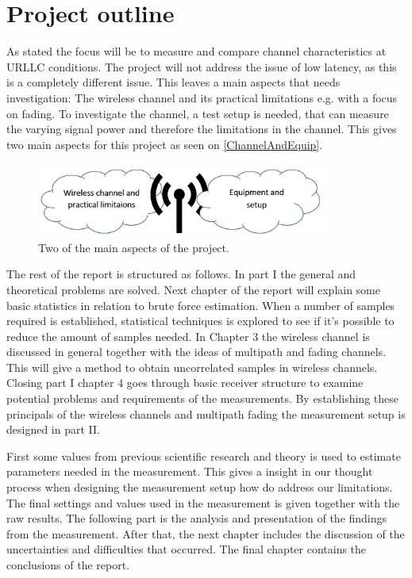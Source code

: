 \section{Project outline}

As stated the focus will be to measure and compare channel characteristics at URLLC conditions. The project will not address the issue of low latency, as this is a completely different issue. This leaves a main aspects that needs investigation: The wireless channel and its practical limitations e.g. with a focus on fading. To investigate the channel, a test setup is needed, that can measure the varying signal power and therefore the limitations in the channel. This gives two main aspects for this project as seen on \autoref{ChannelAndEquip}.

\begin{figure}[H]
\centering
\includegraphics[width=0.85\textwidth]{figures/ProOutline.png}
\caption{Two of the main aspects of the project.}
\label{ChannelAndEquip}
\end{figure}


The rest of the report is structured as follows. In part I the general and theoretical problems are solved. Next chapter of the report will explain some basic statistics in relation to brute force estimation. When a number of samples required is established, statistical techniques is explored to see if it's possible to reduce the amount of samples needed. In Chapter 3 the wireless channel is discussed in general together with  the ideas of multipath and fading channels. This will give a method to obtain uncorrelated samples in wireless channels. Closing part I chapter 4 goes through basic receiver structure to examine potential problems and requirements of the measurements. By establishing these principals of the wireless channels and multipath fading the measurement setup is designed in part II. 

First some values from previous scientific research and theory is used to estimate  parameters needed in the measurement. This gives a insight in our thought process when designing the measurement setup how do address  our limitations. The final settings and values used in the measurement is given together with the raw results. The following part is the analysis and presentation of the findings from the measurement. After that, the next chapter includes the  discussion of the uncertainties and difficulties that occurred. The final chapter contains the conclusions of the report.




 




